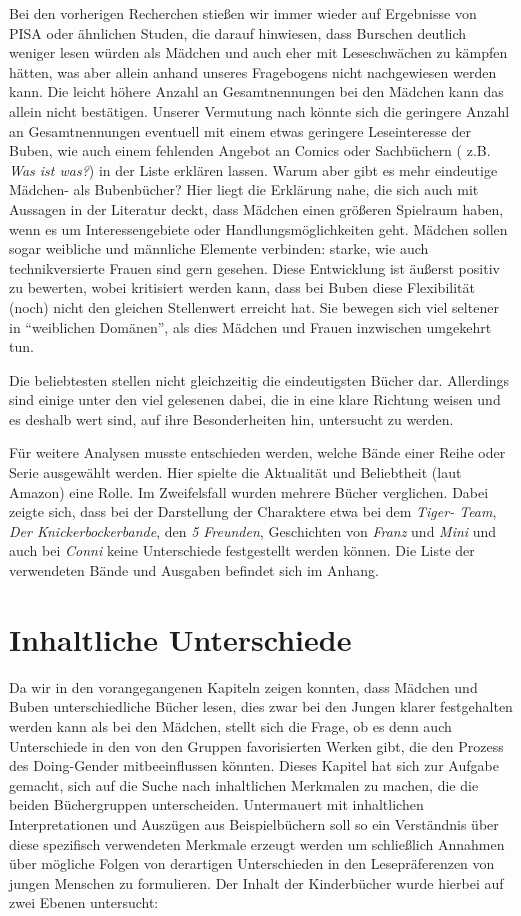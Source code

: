 Bei den vorherigen Recherchen stießen wir immer wieder auf Ergebnisse
von PISA oder ähnlichen Studen, die darauf hinwiesen, dass Burschen
deutlich weniger lesen würden als Mädchen und auch eher mit
Leseschwächen zu kämpfen hätten, was aber allein anhand unseres
Fragebogens nicht nachgewiesen werden kann. Die leicht höhere Anzahl an
Gesamtnennungen bei den Mädchen kann das allein nicht bestätigen.
Unserer Vermutung nach könnte sich die geringere Anzahl an
Gesamtnennungen eventuell mit einem etwas geringere Leseinteresse der
Buben, wie auch einem fehlenden Angebot an Comics oder Sachbüchern (
z.B. \emph{Was ist was?}) in der Liste erklären lassen. Warum aber gibt
es mehr eindeutige Mädchen- als Bubenbücher? Hier liegt die Erklärung
nahe, die sich auch mit Aussagen in der Literatur deckt, dass Mädchen
einen größeren Spielraum haben, wenn es um Interessengebiete oder
Handlungsmöglichkeiten geht. Mädchen sollen sogar weibliche und
männliche Elemente verbinden: starke, wie auch technikversierte Frauen
sind gern gesehen. Diese Entwicklung ist äußerst positiv zu bewerten,
wobei kritisiert werden kann, dass bei Buben diese Flexibilität (noch)
nicht den gleichen Stellenwert erreicht hat. Sie bewegen sich viel
seltener in ``weiblichen Domänen'', als dies Mädchen und Frauen
inzwischen umgekehrt tun.

Die beliebtesten stellen nicht gleichzeitig die eindeutigsten Bücher
dar. Allerdings sind einige unter den viel gelesenen dabei, die in eine
klare Richtung weisen und es deshalb wert sind, auf ihre Besonderheiten
hin, untersucht zu werden.

Für weitere Analysen musste entschieden werden, welche Bände einer Reihe
oder Serie ausgewählt werden. Hier spielte die Aktualität und
Beliebtheit (laut Amazon) eine Rolle. Im Zweifelsfall wurden mehrere
Bücher verglichen. Dabei zeigte sich, dass bei der Darstellung der
Charaktere etwa bei dem \emph{Tiger- Team}, \emph{Der
Knickerbockerbande}, den \emph{5 Freunden}, Geschichten von \emph{Franz}
und \emph{Mini} und auch bei \emph{Conni} keine Unterschiede
festgestellt werden können. Die Liste der verwendeten Bände und Ausgaben
befindet sich im Anhang.

\chapter{Inhaltliche Unterschiede}

Da wir in den vorangegangenen Kapiteln zeigen konnten, dass Mädchen und
Buben unterschiedliche Bücher lesen, dies zwar bei den Jungen klarer
festgehalten werden kann als bei den Mädchen, stellt sich die Frage, ob
es denn auch Unterschiede in den von den Gruppen favorisierten Werken
gibt, die den Prozess des Doing-Gender mitbeeinflussen könnten. Dieses
Kapitel hat sich zur Aufgabe gemacht, sich auf die Suche nach
inhaltlichen Merkmalen zu machen, die die beiden Büchergruppen
unterscheiden. Untermauert mit inhaltlichen Interpretationen und
Auszügen aus Beispielbüchern soll so ein Verständnis über diese
spezifisch verwendeten Merkmale erzeugt werden um schließlich Annahmen
über mögliche Folgen von derartigen Unterschieden in den Lesepräferenzen
von jungen Menschen zu formulieren. Der Inhalt der Kinderbücher wurde
hierbei auf zwei Ebenen untersucht:

